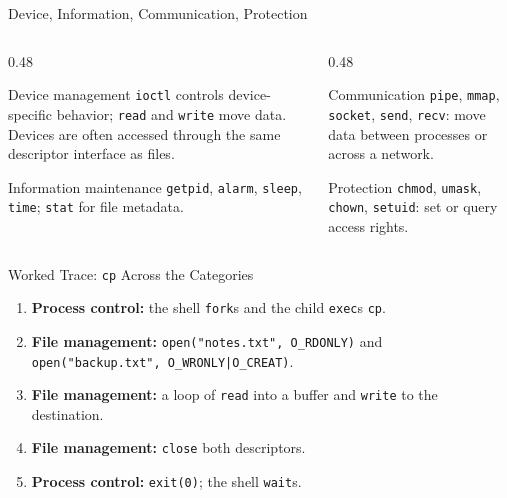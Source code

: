 \documentclass[aspectratio=169]{beamer}
\begin{document}
\begin{frame}{Device, Information, Communication, Protection}
  \begin{columns}[T]
    \begin{column}{0.48\textwidth}
      \begin{block}{Device management}
        \texttt{ioctl} controls device-specific behavior; \texttt{read} and
        \texttt{write} move data. Devices are often accessed through the same
        descriptor interface as files.
      \end{block}
      \begin{block}{Information maintenance}
        \texttt{getpid}, \texttt{alarm}, \texttt{sleep}, \texttt{time};
        \texttt{stat} for file metadata.
      \end{block}
    \end{column}
    \begin{column}{0.48\textwidth}
      \begin{block}{Communication}
        \texttt{pipe}, \texttt{mmap}, \texttt{socket}, \texttt{send},
        \texttt{recv}: move data between processes or across a network.
      \end{block}
      \begin{block}{Protection}
        \texttt{chmod}, \texttt{umask}, \texttt{chown}, \texttt{setuid}: set or
        query access rights.
      \end{block}
    \end{column}
  \end{columns}
\end{frame}

\begin{frame}{Worked Trace: \texttt{cp} Across the Categories}
  \begin{enumerate}
    \item \textbf{Process control:} the shell \texttt{fork}s and the child
      \texttt{exec}s \texttt{cp}.
    \item \textbf{File management:} \texttt{open("notes.txt", O\_RDONLY)} and
      \texttt{open("backup.txt", O\_WRONLY|O\_CREAT)}.
    \item \textbf{File management:} a loop of \texttt{read} into a buffer and
      \texttt{write} to the destination.
    \item \textbf{File management:} \texttt{close} both descriptors.
    \item \textbf{Process control:} \texttt{exit(0)}; the shell \texttt{wait}s.
  \end{enumerate}
  \vspace{0.15cm}
\end{frame}
\end{document}
